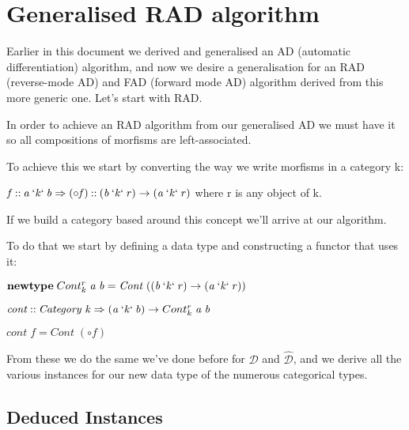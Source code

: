 \documentclass[11pt,a4]{article}
\newcommand{\Conid}[1]{\mathit{#1}}
\newcommand{\Varid}[1]{\mathit{#1}}
\theoremstyle{definition}
\theoremstyle{Definition}
\theoremstyle{Definition}
\begin{document}
    
\newpage
    
\section{Generalised RAD algorithm}

Earlier in this document we derived and generalised an AD (automatic differentiation) algorithm, and now we desire a generalisation for an RAD (reverse-mode AD) and FAD (forward mode AD) algorithm derived from this more generic one. Let's start with RAD.

In order to achieve an RAD algorithm from our generalised AD we must have it so all compositions of morfisms are left-associated. 

To achieve this we start by converting the way we write morfisms in a category k:

\ensuremath{\Varid{f}\mathbin{::}\Varid{a}\mathbin{`\Varid{k}`}\Varid{b}\Rightarrow(\mathbin{\circ}\Varid{f})\mathbin{::}(\Varid{b}\mathbin{`\Varid{k}`}\Varid{r})\rightarrow (\Varid{a}\mathbin{`\Varid{k}`}\Varid{r})} where r is any object of k.

If we build a category based around this concept we'll arrive at our algorithm.

To do that we start by defining a data type and constructing a functor that uses it:

\ensuremath{\mathbf{newtype}\;Cont^{r}_{k}\;\Varid{a}\;\Varid{b}\mathrel{=}\Conid{Cont}\;((\Varid{b}\mathbin{`\Varid{k}`}\Varid{r})\rightarrow (\Varid{a}\mathbin{`\Varid{k}`}\Varid{r}))}

\ensuremath{\Varid{cont}\mathbin{::}\Conid{Category}\;\Varid{k}\Rightarrow(\Varid{a}\mathbin{`\Varid{k}`}\Varid{b})\rightarrow Cont^{r}_{k}\;\Varid{a}\;\Varid{b}}

\ensuremath{\Varid{cont}\;\Varid{f}\mathrel{=}\Conid{Cont}\;(\mathbin{\circ}\Varid{f})}

From these we do the same we've done before for \ensuremath{\mathcal{D}} and \ensuremath{\mathcal{\hat{D}}}, and we derive all the various instances for our new data type of the numerous categorical types.

\subsection{Deduced Instances}
\end{document}
